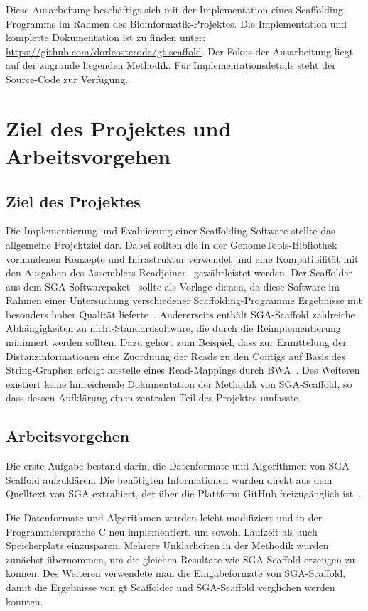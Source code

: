 \documentclass[a4paper,10pt,parskip]{scrartcl}
\begin{document}
Diese Ausarbeitung beschäftigt sich mit der Implementation eines
Scaffolding-Programms im Rahmen des Bioinformatik-Projektes. Die
Implementation und komplette Dokumentation ist zu finden unter:
\url{https://github.com/dorleosterode/gt-scaffold}. Der Fokus der
Ausarbeitung liegt auf der zugrunde liegenden Methodik. Für
Implementationsdetails steht der Source-Code zur Verfügung.

\section{Ziel des Projektes und Arbeitsvorgehen}
\subsection{Ziel des Projektes}
Die Implementierung und Evaluierung einer Scaffolding-Software stellte
das allgemeine Projektziel dar. Dabei sollten die in der
GenomeTools-Bibliothek~\cite{Gremme:2013} vorhandenen Konzepte und
Infrastruktur verwendet und eine Kompatibilität mit den Ausgaben des
Assemblers Readjoiner~\cite{Gonnella:2012gn} gewährleistet werden. Der
Scaffolder aus dem SGA-Softwarepaket~\cite{Simpson:2012ef} sollte als
Vorlage dienen, da diese Software im Rahmen einer Untersuchung
verschiedener Scaffolding-Programme Ergebnisse mit besonders hoher
Qualität lieferte~\cite{Hunt:2014dh}. Andererseits enthält
SGA-Scaffold zahlreiche Abhängigkeiten zu nicht-Standardsoftware, die
durch die Reimplementierung minimiert werden sollten. Dazu gehört zum
Beispiel, dass zur Ermittelung der Distanzinformationen eine Zuordnung
der Reads zu den Contigs auf Basis des String-Graphen erfolgt anstelle
eines Read-Mappings durch BWA~\cite{Li:2009}. Des Weiteren existiert
keine hinreichende Dokumentation der Methodik von SGA-Scaffold, so
dass dessen Aufklärung einen zentralen Teil des Projektes umfasste.

\subsection{Arbeitsvorgehen}
Die erste Aufgabe bestand darin, die Datenformate und Algorithmen
von SGA-Scaffold aufzuklären. Die benötigten Informationen
wurden direkt aus dem Quelltext von SGA extrahiert, der über die
Plattform GitHub freizugänglich ist~\cite{source}.

Die Datenformate und Algorithmen wurden leicht modifiziert und in
der Programmiersprache C neu implementiert, um sowohl Laufzeit
als auch Speicherplatz einzusparen. Mehrere Unklarheiten in der
Methodik wurden zunächst übernommen, um die gleichen Resultate wie
SGA-Scaffold erzeugen zu können. Des Weiteren verwendete man die
Eingabeformate von SGA-Scaffold, damit die Ergebnisse von gt Scaffolder
und SGA-Scaffold verglichen werden konnten.
\end{document}
